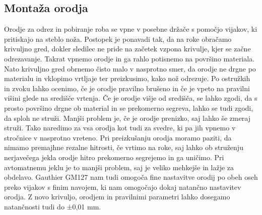 \subsection{Montaža orodja}
Orodje za odrez in pobiranje roba se vpne v posebne držače
s pomočjo vijakov, ki pritiskajo na steblo noža. Postopek je ponavadi tak,
da na roke obračamo krivuljno gred, dokler sledilec ne pride
na začetek vzpona krivulje, kjer se začne odrezavanje. Takrat vpnemo orodje
in ga rahlo potisnemo na površino materiala. Nato krivuljno gred
obrnemo čisto malo v nasprotno smer, da orodje ne drgne po materialu
in vklopimo vrtljaje ter preizkusimo, kako nož odrezuje. Po ostružkih
in zvoku lahko ocenimo, če je orodje pravilno brušeno in če je vpeto
na pravilni višini glede na središče vrtenja. Če je orodje višje od
središča, se lahko zgodi, da s prosto površino drgne ob material in
se prekomerno segreva, lahko se tudi zgodi, da sploh ne struži.
Manjši problem je, če je orodje prenizko, saj lahko še zmeraj
struži. Tako naredimo za vsa orodja kot tudi za svedre,
ki pa jih vpnemo v stročnice v nasprotno vreteno. Pri preizkušanju
orodja moramo paziti, da nimamo premajhne rezalne hitrosti, če
vrtimo na roke, saj lahko ob struženju nerjavečega jekla orodje
hitro prekomerno segrejemo in ga uničimo. Pri avtomatnemu jeklu
je to manjši problem, saj je veliko mehkejše in lažje za obdelavo.
Gauthier GM127 nam tudi omogoča fine nastavitve orodij po obeh oseh
preko vijakov s finim navojem, ki nam omogočajo dokaj natančno
nastavitev orodja. Z novo krivuljo, orodjem in pravilnimi parametri
lahko dosegamo natančnosti tudi do ±0,01 mm.
